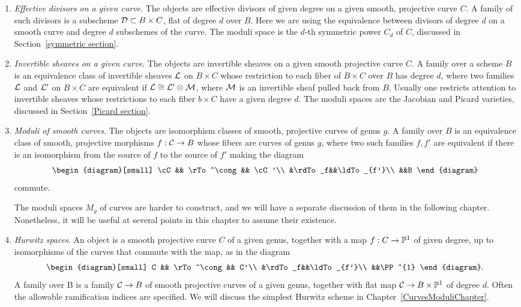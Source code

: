 \begin{enumerate}\label{list of moduli problems}

\item \emph{Effective divisors on a given curve}. The objects are effective divisors of given degree on a given smooth, projective curve $C$. A family of such divisors is a subscheme ${\mathcal D} \subset B \times C$, flat of degree $d$ over $B$. 
Here we are using
the equivalence between divisors of degree $d$ on a smooth curve and degree $d$ subschemes of the curve. The moduli space is the $d$-th symmetric power $C_d$ of $C$, discussed in Section~\ref{symmetric section}.

\item \emph{Invertible sheaves on a given curve}. The objects are invertible sheaves on a given smooth projective curve $C$. A family over a scheme $B$ is an equivalence class of invertible sheaves ${\mathcal L}$ on $B \times C$ whose restriction to each fiber of $B \times C$ over $B$ has degree $d$, where two families ${\mathcal L}$ and ${\mathcal L}'$ on $B \times C$ are equivalent if ${\mathcal L}\cong {\mathcal L}' \otimes {\mathcal M}$, where ${\mathcal M}$ is  an invertible sheaf pulled back from $B$. Usually one restricts attention to invertible sheaves 
whose restrictions to each fiber $b\times C$ have a given degree $d$.
The moduli spaces are the Jacobian and Picard varieties, discussed in Section~\ref{Picard section}.

\item \emph{Moduli of smooth curves}. The objects are isomorphism classes of smooth, projective curves of genus $g$. A family over $B$ is an equivalence class of smooth, projective morphisms $f : \mathcal C \to B$ whose fibers are curves of genus $g$, where two such families $f, f'$
are equivalent if there is an isomorphism from the source of $f$ to the source
of $f'$ making the diagram
$$
\begin{diagram}[small]
\cC && \rTo^\cong && \cC'\\
&\rdTo_f&&\ldTo_{f'}\\
&&B
\end{diagram}
$$
commute.

The moduli spaces $M_g$ of curves are harder to construct, and we will have a separate discussion of them in the following chapter. Nonetheless, it will be useful at several points in this chapter to assume their existence.

\item \emph{Hurwitz spaces}. An object is a smooth projective curve $C$ of a given genus, together with a map $f: C\to {\mathbb P}^1$ of given degree, up to isomorphisms of the curves that commute with the map, as in the diagram
$$
\begin{diagram}[small]
C && \rTo^\cong && C'\\
&\rdTo_f&&\ldTo_{f'}\\
&&\PP^{1}
\end{diagram}.
$$
A family over B is a family $\mathcal C \to B$ of smooth projective curves  of a given genus, together with flat map $\mathcal C \to B\times {\mathbb P}^{1}$ of degree $d$.
 Often the allowable ramification indices are specified. We will discuss the simplest Hurwitz scheme in Chapter~\ref{CurvesModuliChapter}.


\end{enumerate}
